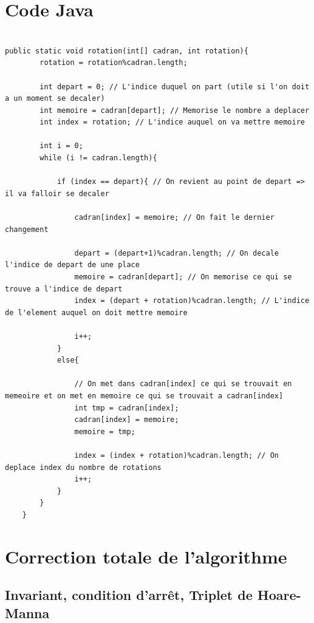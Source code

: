 \documentclass[a4paper, 12pt]{article}
\begin{document}
\newpage
\section{Code Java}



\begin{lstlisting}[frame=single]

public static void rotation(int[] cadran, int rotation){
        rotation = rotation%cadran.length;
        
        int depart = 0; // L'indice duquel on part (utile si l'on doit a un moment se decaler)
        int memoire = cadran[depart]; // Memorise le nombre a deplacer
        int index = rotation; // L'indice auquel on va mettre memoire
        
        int i = 0;
        while (i != cadran.length){
            
            if (index == depart){ // On revient au point de depart => il va falloir se decaler
                
                cadran[index] = memoire; // On fait le dernier changement

                depart = (depart+1)%cadran.length; // On decale l'indice de depart de une place
                memoire = cadran[depart]; // On memorise ce qui se trouve a l'indice de depart
                index = (depart + rotation)%cadran.length; // L'indice de l'element auquel on doit mettre memoire
                
                i++;
            }
            else{
                
                // On met dans cadran[index] ce qui se trouvait en memeoire et on met en memoire ce qui se trouvait a cadran[index]
                int tmp = cadran[index];
                cadran[index] = memoire;
                memoire = tmp;
                
                index = (index + rotation)%cadran.length; // On deplace index du nombre de rotations
                i++;
            }
        }
	}

\end{lstlisting} 

\section{Correction totale de l'algorithme}
\subsection{Invariant, condition d'arrêt, Triplet de Hoare-Manna}
\end{document}
